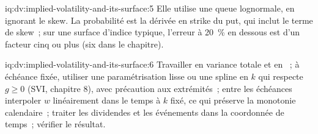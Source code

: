 \begin{solution}{iq:dv:implied-volatility-and-its-surface:5}
Elle utilise une queue lognormale, en ignorant le skew. La probabilité est la dérivée en strike du
put, qui inclut le terme de skew~; sur une surface d'indice typique, l'erreur à 20~\% en dessous est
d'un facteur cinq ou plus (six dans le chapitre).
\end{solution}

\begin{solution}{iq:dv:implied-volatility-and-its-surface:6}
Travailler en variance totale et en ~; à échéance fixée, utiliser une paramétrisation lisse ou une
spline en $k$ qui respecte $g\ge0$ (SVI, chapitre 8), avec précaution aux extrémités~; entre les échéances
interpoler $w$ linéairement dans le temps à $k$ fixé, ce qui préserve la monotonie calendaire~; traiter
les dividendes et les événements dans la coordonnée de temps~; vérifier le résultat.
\end{solution}
